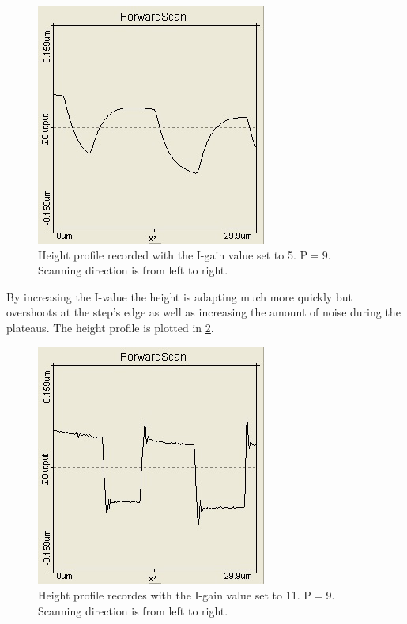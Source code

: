 \documentclass[paper=a4,fontsize=10pt,DIV=18,twocolumn,parskip=half]{scrartcl}
\numberwithin{equation}{section}    %
\begin{document}
\begin{figure}[htp]
	\begin{center}
		\includegraphics[width=0.6\columnwidth]{Bilder/wenigI}
		\caption{Height profile recorded with the I-gain value set to 5. $\mathrm{P}=9$. Scanning direction is from left to right.}
		\label{wenigI}
	\end{center}
\end{figure}

By increasing the I-value the height is adapting much more quickly but overshoots at the step's edge as well as increasing the amount of noise during the plateaus. The height profile is plotted in \ref{vielI}.

\begin{figure}[htp]
	\begin{center}
		\includegraphics[width=0.6\columnwidth]{Bilder/vielI}
		\caption{Height profile recordes with the I-gain value set to 11. $\mathrm{P}=9$. Scanning direction is from left to right.}
		\label{vielI}
	\end{center}
\end{figure}
\end{document}
